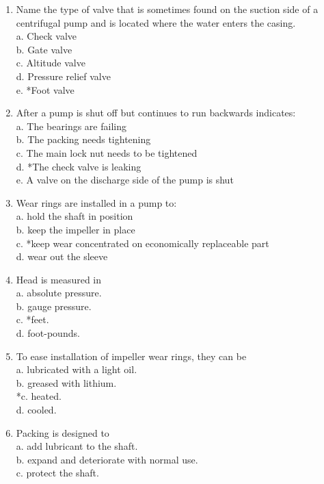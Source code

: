 \begin{enumerate}[1.]
\item Name the type of valve that is sometimes found on the suction side of a centrifugal pump and is located where the water enters the casing.\\
a. Check valve\\
b. Gate valve\\
c. Altitude valve\\
d. Pressure relief valve\\
e. *Foot valve\\
\item After a pump is shut off but continues to run backwards indicates:\\
a. The bearings are failing\\
b. The packing needs tightening\\
c. The main lock nut needs to be tightened\\
d. *The check valve is leaking\\
e. A valve on the discharge side of the pump is shut\\
\item Wear rings are installed in a pump to:\\
a. hold the shaft in position\\
b. keep the impeller in place\\
c. *keep wear concentrated on economically replaceable part\\
d. wear out the sleeve\\
\item Head is measured in\\
a. absolute pressure.\\
b. gauge pressure.\\
c. *feet.\\
d. foot-pounds.\\
\item To ease installation of impeller wear rings, they can be\\
a. lubricated with a light oil.\\
b. greased with lithium.\\
*c. heated.\\
d. cooled.\\
\item Packing is designed to\\
a. add lubricant to the shaft.\\
b. expand and deteriorate with normal use.\\
c. protect the shaft.\\

\end{enumerate}
